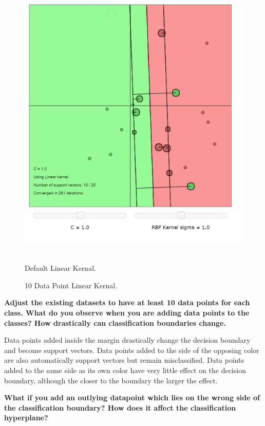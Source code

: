 \documentclass[11pt,oneside,a4paper]{article}
\begin{document}
\begin{figure}[h!]
{	}%
	\else
	\hbox{%
		\includegraphics[height=\ht0]{../Figures/10_point_linear_Kernal}%
	}%
	\fi
	\noindent
	\parbox{.45\textwidth}{%
		\centering
		\caption{Default Linear Kernal.}
	}%
	\hfil
	\parbox{.45\textwidth}{%
		\centering
		\caption{10 Data Point Linear Kernal.}
	}%
\end{figure}

\textbf{Adjust the existing datasets to have at least 10 data points for each class. What do you observe when you are adding data points to the classes? How drastically can classification boundaries change.}

Data points added inside the margin drastically change the decision boundary  and become support vectors. Data points added to the side of the opposing color are also automatically support vectors but remain misclassified. Data points added to the same side as its own color have very little effect on the decision boundary, although the closer to the boundary the larger the effect. 

\textbf{What if you add an outlying datapoint which lies on the wrong side of the classification boundary? How does it affect the classification hyperplane?}
\end{document}
